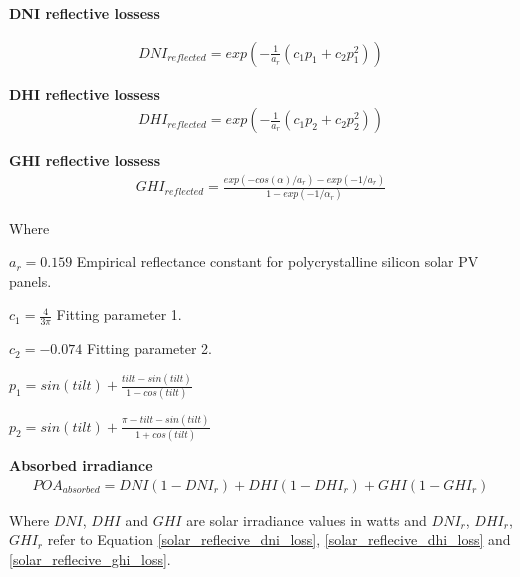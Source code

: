\noindent\textbf{DNI reflective lossess}

\begin{equation} 
\begin{split}
\label{solar_reflecive_dni_loss} 
DNI_{reflected}= exp(-\frac{1}{a_r}(c_1 p_1 +c_2 p_1^2))
\end{split}
\end{equation}


\noindent\textbf{DHI reflective lossess}
%
\begin{equation}
\begin{split}
\label{solar_reflecive_dhi_loss}
DHI_{reflected}= exp(-\frac{1}{a_r}(c_1 p_2 +c_2 p_2^2))
\end{split}
\end{equation}

\noindent\textbf{GHI reflective lossess}
%
\begin{equation}
\begin{split}
\label{solar_reflecive_ghi_loss}
GHI_{reflected} = \frac{exp(-cos(\alpha)/a_r)- exp(-1/a_r)}{1-exp(-1/\alpha_r)}
\end{split}
\end{equation}

\noindent Where

$a_r = 0.159$ Empirical reflectance constant for polycrystalline silicon solar PV panels.

$c_1= \frac{4}{3\pi}$  Fitting parameter 1.

$c_2 = -0.074$ Fitting parameter 2.

$p_1= sin(tilt) + \frac{tilt-sin(tilt)}{1-cos(tilt)}$

$p_2= sin(tilt) + \frac{\pi - tilt-sin(tilt)}{1+cos(tilt)}$


\noindent\textbf{Absorbed irradiance}
\begin{equation}
\begin{split}
\label{solar_reflecive_absorbed}
POA_{absorbed} = DNI(1-DNI_{r})+ DHI(1-DHI_{r})+GHI(1-GHI_{r})
\end{split}
\end{equation}

\noindent Where $DNI$, $DHI$ and $GHI$ are solar irradiance values in watts and $DNI_r$, $DHI_r$, $GHI_r$ refer to Equation \ref{solar_reflecive_dni_loss}, \ref{solar_reflecive_dhi_loss} and \ref{solar_reflecive_ghi_loss}.





